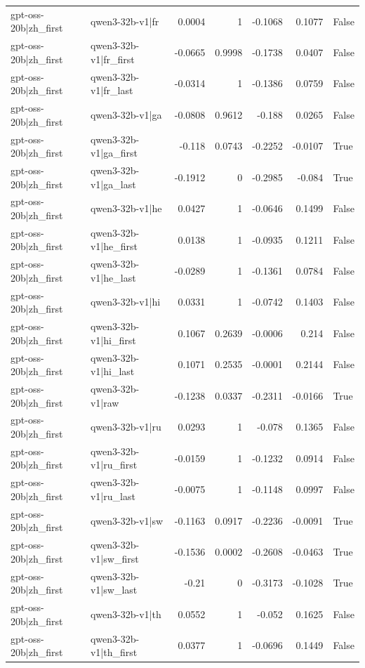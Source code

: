 \begin{table}
\begin{tabular}{l l r r r r l}
gpt-oss-20b|zh_first & qwen3-32b-v1|fr & 0.0004 & 1 & -0.1068 & 0.1077 & False \\
gpt-oss-20b|zh_first & qwen3-32b-v1|fr_first & -0.0665 & 0.9998 & -0.1738 & 0.0407 & False \\
gpt-oss-20b|zh_first & qwen3-32b-v1|fr_last & -0.0314 & 1 & -0.1386 & 0.0759 & False \\
gpt-oss-20b|zh_first & qwen3-32b-v1|ga & -0.0808 & 0.9612 & -0.188 & 0.0265 & False \\
gpt-oss-20b|zh_first & qwen3-32b-v1|ga_first & -0.118 & 0.0743 & -0.2252 & -0.0107 & True \\
gpt-oss-20b|zh_first & qwen3-32b-v1|ga_last & -0.1912 & 0 & -0.2985 & -0.084 & True \\
gpt-oss-20b|zh_first & qwen3-32b-v1|he & 0.0427 & 1 & -0.0646 & 0.1499 & False \\
gpt-oss-20b|zh_first & qwen3-32b-v1|he_first & 0.0138 & 1 & -0.0935 & 0.1211 & False \\
gpt-oss-20b|zh_first & qwen3-32b-v1|he_last & -0.0289 & 1 & -0.1361 & 0.0784 & False \\
gpt-oss-20b|zh_first & qwen3-32b-v1|hi & 0.0331 & 1 & -0.0742 & 0.1403 & False \\
gpt-oss-20b|zh_first & qwen3-32b-v1|hi_first & 0.1067 & 0.2639 & -0.0006 & 0.214 & False \\
gpt-oss-20b|zh_first & qwen3-32b-v1|hi_last & 0.1071 & 0.2535 & -0.0001 & 0.2144 & False \\
gpt-oss-20b|zh_first & qwen3-32b-v1|raw & -0.1238 & 0.0337 & -0.2311 & -0.0166 & True \\
gpt-oss-20b|zh_first & qwen3-32b-v1|ru & 0.0293 & 1 & -0.078 & 0.1365 & False \\
gpt-oss-20b|zh_first & qwen3-32b-v1|ru_first & -0.0159 & 1 & -0.1232 & 0.0914 & False \\
gpt-oss-20b|zh_first & qwen3-32b-v1|ru_last & -0.0075 & 1 & -0.1148 & 0.0997 & False \\
gpt-oss-20b|zh_first & qwen3-32b-v1|sw & -0.1163 & 0.0917 & -0.2236 & -0.0091 & True \\
gpt-oss-20b|zh_first & qwen3-32b-v1|sw_first & -0.1536 & 0.0002 & -0.2608 & -0.0463 & True \\
gpt-oss-20b|zh_first & qwen3-32b-v1|sw_last & -0.21 & 0 & -0.3173 & -0.1028 & True \\
gpt-oss-20b|zh_first & qwen3-32b-v1|th & 0.0552 & 1 & -0.052 & 0.1625 & False \\
gpt-oss-20b|zh_first & qwen3-32b-v1|th_first & 0.0377 & 1 & -0.0696 & 0.1449 & False \\

\end{tabular}
\end{table}
